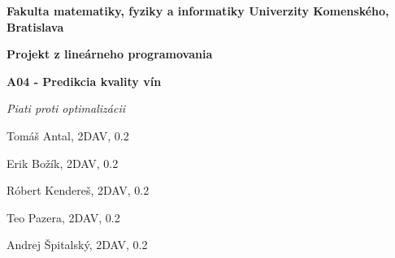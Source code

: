 \documentclass[12pt,oneside,a4paper,slovak]{article}
\begin{document}
	\begin{titlepage}
		\large
		
		\begin{center}
			\textbf{Fakulta matematiky, fyziky a informatiky Univerzity Komenského, Bratislava}
			
			\vspace{8cm}
			
			\LARGE\textbf{Projekt z lineárneho programovania}
			
			\LARGE\textbf{A04 - Predikcia kvality vín}
			
			\bigskip 
		\end{center}
			
		\vfill
		
		\hfill
		\begin{minipage}{0.5\textwidth}
			\raggedleft
			
			\textit{Piati proti optimalizácii}
	
			Tomáš Antal, 2DAV, 0.2
			
			Erik Božík, 2DAV, 0.2
			
			Róbert Kendereš, 2DAV, 0.2
			
			Teo Pazera, 2DAV, 0.2
			
			Andrej Špitalský, 2DAV, 0.2
		\end{minipage}
			
	\end{titlepage}
	
	\tableofcontents
	\newpage
	
	
	\newpage
	
	\newpage
	
	\newpage
	
	\newpage
	
	\newpage
	
	\newpage
	
	\newpage
	
	\newpage
	
\end{document}
